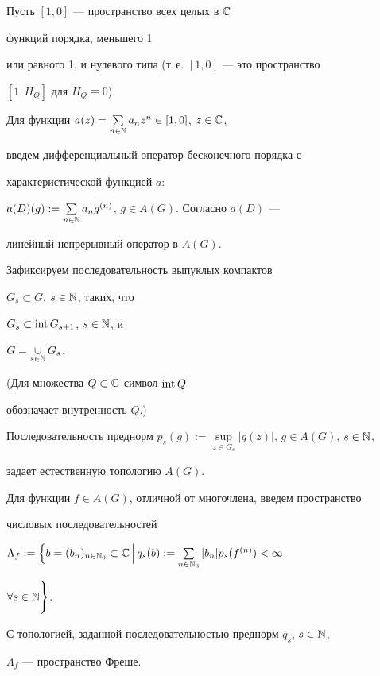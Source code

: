 Пусть $[1,0]$ --- пространство всех целых в $\Bbb C$


функций порядка, меньшего 1


или равного 1, и нулевого типа (т.\,е. $[1,0]$ --- это пространство


$[1,H_Q]$ для $H_Q\equiv 0$).


Для функции $a(z)=\sum\limits_{n\in\Bbb N}


a_n z^{n}\in[1,0]$, $z\in\Bbb C$,


введем дифференциальный оператор бесконечного порядка с


характеристической функцией $a$:


$a(D)(g):= \sum\limits_{n\in\Bbb N}


a_n g^{(n)}$, $g\in A(G)$. Согласно \cite{KOROPER} $a(D)$ ---


линейный непрерывный оператор в $A(G)$.





Зафиксируем последовательность выпуклых компактов


$G_s\subset G$, $s\in\Bbb N$, таких, что


$G_s\subset\operatorname{int} G_{s+1}$, $s\in\Bbb N$, и


$G=\mathop{\cup}\limits_{s\in\Bbb N}G_s$.


(Для множества $Q\subset\Bbb C$ символ $\operatorname{int} Q$


обозначает внутренность $Q$.)


Последовательность преднорм $p_s(g):=


\sup\limits_{z\in G_s}|g(z)|$, $g\in A(G)$, $s\in\Bbb N$,


задает естественную топологию $A(G)$.





Для функции $f\in A(G)$, отличной от многочлена, введем пространство


числовых последовательностей


$\Lambda_f:=


\Big\{b=(b_n)_{n\in\Bbb N_0}\subset\Bbb C\,\Big|\,


q_s(b):=\sum\limits_{n\in\Bbb N_0}|b_n|p_s(f^{(n)})<\infty$


$\forall s\in\Bbb N \Bigg\}$.


С топологией, заданной последовательностью преднорм $q_s$, $s\in\Bbb N$,


$\Lambda_f$ --- пространство Фреше.





